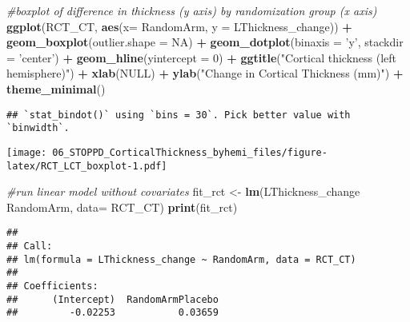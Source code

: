 \documentclass[]{article}
\newenvironment{Shaded}{\begin{snugshade}}{\end{snugshade}}
\newcommand{\KeywordTok}[1]{\textcolor[rgb]{0.13,0.29,0.53}{\textbf{#1}}}
\newcommand{\DataTypeTok}[1]{\textcolor[rgb]{0.13,0.29,0.53}{#1}}
\newcommand{\DecValTok}[1]{\textcolor[rgb]{0.00,0.00,0.81}{#1}}
\newcommand{\StringTok}[1]{\textcolor[rgb]{0.31,0.60,0.02}{#1}}
\newcommand{\CommentTok}[1]{\textcolor[rgb]{0.56,0.35,0.01}{\textit{#1}}}
\newcommand{\OtherTok}[1]{\textcolor[rgb]{0.56,0.35,0.01}{#1}}
\newcommand{\OperatorTok}[1]{\textcolor[rgb]{0.81,0.36,0.00}{\textbf{#1}}}
\newcommand{\NormalTok}[1]{#1}
\theoremstyle{definition}
\theoremstyle{definition}
\theoremstyle{definition}
\theoremstyle{remark}
\begin{document}
\begin{Shaded}
\begin{Highlighting}[]
\CommentTok{#boxplot of difference in thickness (y axis) by randomization group (x axis)}
\KeywordTok{ggplot}\NormalTok{(RCT_CT, }\KeywordTok{aes}\NormalTok{(}\DataTypeTok{x=}\NormalTok{ RandomArm, }\DataTypeTok{y =}\NormalTok{ LThickness_change)) }\OperatorTok{+}\StringTok{ }
\StringTok{     }\KeywordTok{geom_boxplot}\NormalTok{(}\DataTypeTok{outlier.shape =} \OtherTok{NA}\NormalTok{) }\OperatorTok{+}\StringTok{ }
\StringTok{     }\KeywordTok{geom_dotplot}\NormalTok{(}\DataTypeTok{binaxis =} \StringTok{'y'}\NormalTok{, }\DataTypeTok{stackdir =} \StringTok{'center'}\NormalTok{) }\OperatorTok{+}
\StringTok{     }\KeywordTok{geom_hline}\NormalTok{(}\DataTypeTok{yintercept =} \DecValTok{0}\NormalTok{) }\OperatorTok{+}
\StringTok{     }\KeywordTok{ggtitle}\NormalTok{(}\StringTok{"Cortical thickness (left hemisphere)"}\NormalTok{) }\OperatorTok{+}
\StringTok{     }\KeywordTok{xlab}\NormalTok{(}\OtherTok{NULL}\NormalTok{) }\OperatorTok{+}
\StringTok{     }\KeywordTok{ylab}\NormalTok{(}\StringTok{"Change in Cortical Thickness (mm)"}\NormalTok{) }\OperatorTok{+}
\StringTok{     }\KeywordTok{theme_minimal}\NormalTok{()}
\end{Highlighting}
\end{Shaded}

\begin{verbatim}
## `stat_bindot()` using `bins = 30`. Pick better value with `binwidth`.
\end{verbatim}

\texttt{[image: 06\_STOPPD\_CorticalThickness\_byhemi\_files/figure-latex/RCT\_LCT\_boxplot-1.pdf]}

\begin{Shaded}
\begin{Highlighting}[]
\CommentTok{#run linear model without covariates}
\NormalTok{  fit_rct <-}\StringTok{ }\KeywordTok{lm}\NormalTok{(LThickness_change }\OperatorTok{~}\StringTok{ }\NormalTok{RandomArm, }\DataTypeTok{data=}\NormalTok{ RCT_CT)}
  \KeywordTok{print}\NormalTok{(fit_rct)}
\end{Highlighting}
\end{Shaded}

\begin{verbatim}
## 
## Call:
## lm(formula = LThickness_change ~ RandomArm, data = RCT_CT)
## 
## Coefficients:
##      (Intercept)  RandomArmPlacebo  
##         -0.02253           0.03659
\end{verbatim}
\end{document}
